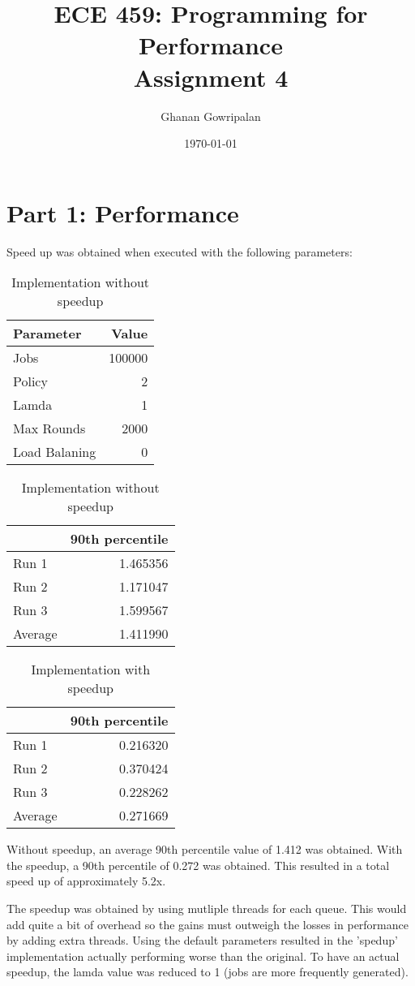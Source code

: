 \documentclass[12pt]{article}
\title{ECE 459: Programming for Performance\\Assignment 4}
\author{Ghanan Gowripalan}
\date{\today}
\begin{document}
\maketitle

\section*{Part 1: Performance}

Speed up was obtained when executed with the following parameters:
\begin{table}[H]
  \centering
  \begin{tabular}{lr}
    {\bf Parameter} & {\bf Value} \\
    \hline
    Jobs & 100000 \\
    Policy & 2 \\
    Lamda & 1 \\
    Max Rounds & 2000 \\
    Load Balaning & 0 \\
  \end{tabular}
  \caption{Implementation without speedup}
  \label{tbl-part1-params}
\end{table}

\begin{table}[H]
  \centering
  \begin{tabular}{lr}
    & {\bf 90th percentile} \\
    \hline
    Run 1 & 1.465356 \\
    Run 2 & 1.171047 \\
    Run 3 & 1.599567 \\
    \hline
    Average & 1.411990 \\
  \end{tabular}
  \caption{Implementation without speedup}
  \label{tbl-part1-originall}
\end{table}


\begin{table}[H]
  \centering
  \begin{tabular}{lr}
    & {\bf 90th percentile} \\
    \hline
    Run 1 & 0.216320 \\
    Run 2 & 0.370424 \\
    Run 3 & 0.228262 \\
    \hline
    Average & 0.271669 \\
  \end{tabular}
  \caption{Implementation with speedup}
  \label{tbl-part1-speedup}
\end{table}

Without speedup, an average 90th percentile value of 1.412 was obtained. With the speedup, a 90th percentile of 0.272 was obtained. This resulted in a total speed up of approximately 5.2x.

The speedup was obtained by using mutliple threads for each queue. This would add quite a bit of overhead so the gains must outweigh the losses in performance by adding extra threads. Using the default parameters resulted in the 'spedup' implementation actually performing worse than the original. To have an actual speedup, the lamda value was reduced to 1 (jobs are more frequently generated).
\end{document}
